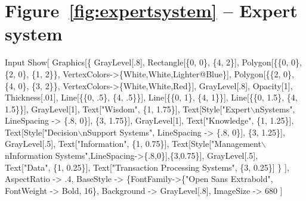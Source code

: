 \documentclass[11pt,fleqn]{book} %
\begin{document}
\section*{Figure~\ref{fig:expertsystem} -- Expert system }
\small{
\begin{mmaCell}[index=1]{Input}
  Show[
    Graphics[\{
      GrayLevel[.8], 
      Rectangle[\{0, 0\}, \{4, 2\}],
      Polygon[\{\{0, 0\}, \{2, 0\}, \{1, 2\}\}, VertexColors->\{White,White,Lighter@Blue\}],
      Polygon[\{\{2, 0\}, \{4, 0\}, \{3, 2\}\}, VertexColors->\{White,White,Red\}],
      GrayLevel[.8], Opacity[1], Thickness[.01],
      Line[\{\{0, .5\}, \{4, .5\}\}],
      Line[\{\{0, 1\}, \{4, 1\}\}], Line[\{\{0, 1.5\}, \{4, 1.5\}\}],
      GrayLevel[1], Text["Wisdom", \{1, 1.75\}],
      Text[Style["Expert\(\backslash\)nSystems", LineSpacing -> \{.8, 0\}], \{3, 1.75\}],
      GrayLevel[1], Text["Knowledge", \{1, 1.25\}],
      Text[Style["Decision\(\backslash\)nSupport Systems", LineSpacing -> \{.8, 0\}], \{3, 1.25\}],
      GrayLevel[.5], Text["Information", \{1, 0.75\}],
      Text[Style["Management\(\backslash\)nInformation Systems",LineSpacing->\{.8,0\}],\{3,0.75\}],
      GrayLevel[.5], Text["Data", \{1, 0.25\}],
      Text["Transaction Processing Systems", \{3, 0.25\}] \}
    ], 
    AspectRatio -> .4, 
    BaseStyle   -> \{FontFamily->\{"Open Sans Extrabold", FontWeight -> Bold, 16\}, 
    Background  -> GrayLevel[.8],
    ImageSize   -> 680
  ]
\end{mmaCell}
}

\end{document}
